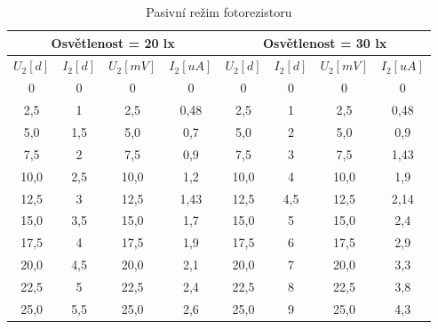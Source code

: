 \documentclass[12pt]{article} %
\begin{document}
\begin{table}[H]
\caption{Pasivní režim fotorezistoru}
\begin{tabular}{|c|c|c|c|c|c|c|c|}
\hline 
\multicolumn{4}{|c|}{Osvětlenost = 20 lx} & \multicolumn{4}{|c|}{Osvětlenost = 30 lx} \\ 
\hline 
$U_2 [d]$ & $I_2 [d]$ & $U_2 [mV]$ & $I_2 [uA]$ & $U_2 [d]$ & $I_2 [d]$ & $U_2 [mV]$ & $I_2 [uA]$ \\ 
\hline 
0 & 0 & 0 & 0 & 0 & 0 & 0 & 0 \\ 
\hline 
2,5 & 1 & 2,5 & 0,48 & 2,5 & 1 & 2,5 & 0,48 \\ 
\hline 
5,0 & 1,5 & 5,0 & 0,7 & 5,0 & 2 & 5,0 & 0,9 \\ 
\hline 
7,5 & 2 & 7,5 & 0,9 & 7,5 & 3 & 7,5 & 1,43 \\ 
\hline 
10,0 & 2,5 & 10,0 & 1,2 & 10,0 & 4 & 10,0 & 1,9 \\ 
\hline 
12,5 & 3 & 12,5 & 1,43 & 12,5 & 4,5 & 12,5 & 2,14 \\ 
\hline 
15,0 & 3,5 & 15,0 & 1,7 & 15,0 & 5 & 15,0 & 2,4 \\ 
\hline 
17,5 & 4 & 17,5 & 1,9 & 17,5 & 6 & 17,5 & 2,9 \\ 
\hline 
20,0 & 4,5 & 20,0 & 2,1 & 20,0 & 7 & 20,0 & 3,3 \\ 
\hline 
22,5 & 5 & 22,5 & 2,4 & 22,5 & 8 & 22,5 & 3,8 \\ 
\hline 
25,0 & 5,5 & 25,0 & 2,6 & 25,0 & 9 & 25,0 & 4,3 \\ 
\hline 
\end{tabular} 
\end{table}
\end{document}
